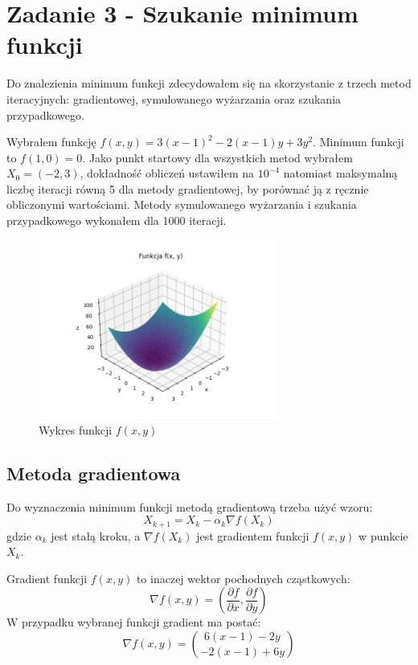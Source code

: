 \documentclass{article}
\begin{document}
\section{Zadanie 3 - Szukanie minimum funkcji}

Do znalezienia minimum funkcji zdecydowałem się na skorzystanie z
trzech metod iteracyjnych: gradientowej, symulowanego wyżarzania
oraz szukania przypadkowego.

Wybrałem funkcję $f(x, y) = 3(x-1)^2-2(x-1)y+3y^2$. Minimum funkcji to $f(1, 0) = 0$.
Jako punkt startowy dla wszystkich metod wybrałem $X_0 = (-2, 3)$, dokładność
obliczeń ustawiłem na $10^{-4}$ natomiast maksymalną liczbę iteracji równą 5 dla
metody gradientowej, by porównać ją z ręcznie obliczonymi wartościami. Metody
symulowanego wyżarzania i szukania przypadkowego wykonałem dla 1000 iteracji.

\begin{figure}[H]
    \centering
    \includegraphics[width=0.7\textwidth]{Zad3/function.png}
    \caption{Wykres funkcji $f(x, y)$}
\end{figure}

\subsection{Metoda gradientowa}

Do wyznaczenia minimum funkcji metodą gradientową trzeba użyć
wzoru:
\begin{equation}
X_{k+1} = X_k - \alpha_k \nabla f(X_k)
\end{equation}
gdzie $\alpha_k$ jest stałą kroku, 
a $\nabla f(X_k)$ jest gradientem
funkcji $f(x, y)$ w punkcie $X_k$.

Gradient funkcji $f(x, y)$ to inaczej wektor pochodnych
cząstkowych:
\begin{equation}
\nabla f(x, y) = \left( \frac{\partial f}{\partial x}, \frac{\partial f}{\partial y} \right)
\end{equation}
W przypadku wybranej funkcji gradient ma postać:
\begin{equation}
\nabla f(x, y) = {6(x - 1)-2y \choose -2(x-1)+6y}
\end{equation}
\end{document}
